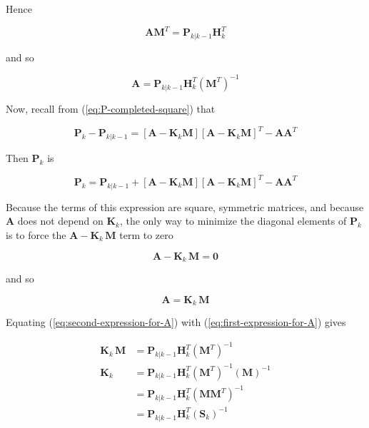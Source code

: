 \documentclass[12pt]{article}
\begin{document}
Hence

\begin{equation*}
    \mathbf{A} \mathbf{M}^T = \mathbf{P}_{k|k-1} \mathbf{H}_k^T
\end{equation*}

and so

\begin{equation}
    \mathbf{A} = \mathbf{P}_{k|k-1} \mathbf{H}_k^T \left( \mathbf{M}^T \right)^{-1}
    \label{eq:first-expression-for-A}
\end{equation}

Now, recall from (\ref{eq:P-completed-square}) that

\begin{equation*}
    \mathbf{P}_{k} - \mathbf{P}_{k|k-1} = \left[ \mathbf{A} - \mathbf{K}_k \mathbf{M} \right] \left[ \mathbf{A} - \mathbf{K}_k \mathbf{M} \right]^T - \mathbf{A} \mathbf{A}^T
\end{equation*}

Then $\mathbf{P}_{k}$ is

\begin{equation*}
    \mathbf{P}_{k} = \mathbf{P}_{k|k-1} + \left[ \mathbf{A} - \mathbf{K}_k \mathbf{M} \right] \left[ \mathbf{A} - \mathbf{K}_k \mathbf{M} \right]^T - \mathbf{A} \mathbf{A}^T
\end{equation*}

Because the terms of this expression are square, symmetric matrices, and because $\mathbf{A}$ 
does not depend on $\mathbf{K}_k$, the only way to minimize the diagonal elements of
$\mathbf{P}_k$ is to force the $\mathbf{A} - \mathbf{K}_k \, \mathbf{M}$ term to zero

\begin{equation*}
    \mathbf{A} - \mathbf{K}_k \, \mathbf{M} = \mathbf{0}
\end{equation*}

and so

\begin{equation}
    \mathbf{A} = \mathbf{K}_k \, \mathbf{M}
    \label{eq:second-expression-for-A}
\end{equation}

Equating (\ref{eq:second-expression-for-A}) with (\ref{eq:first-expression-for-A}) gives

\begin{equation*}
    \begin{aligned}
        \mathbf{K}_k \, \mathbf{M} &= \mathbf{P}_{k|k-1} \mathbf{H}_k^T \left( \mathbf{M}^T \right)^{-1} \\
        \mathbf{K}_k &= \mathbf{P}_{k|k-1} \mathbf{H}_k^T \left( \mathbf{M}^T \right)^{-1} \left( \mathbf{M} \right)^{-1} \\
                     &= \mathbf{P}_{k|k-1} \mathbf{H}_k^T \left( \mathbf{M} \mathbf{M}^T \right)^{-1} \\
                     &= \mathbf{P}_{k|k-1} \mathbf{H}_k^T \left( \mathbf{S}_k \right)^{-1}
    \end{aligned}
\end{equation*}
\end{document}
